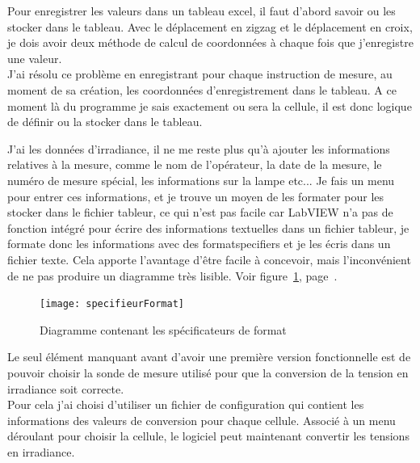 \documentclass[12pt]{article}
\begin{document}
Pour enregistrer les valeurs dans un tableau excel, il faut d'abord savoir ou les stocker dans le tableau.
Avec le déplacement en zigzag et le déplacement en croix, je dois avoir deux méthode de calcul de coordonnées à chaque fois que j'enregistre une valeur.\\
J'ai résolu ce problème en enregistrant pour chaque instruction de mesure, au moment de sa création, les coordonnées d'enregistrement dans le tableau.
A ce moment là du programme je sais exactement ou sera la cellule, il est donc logique de définir ou la stocker dans le tableau.


J'ai les données d'irradiance, il ne me reste plus qu'à ajouter les informations relatives à la mesure, comme le nom de l'opérateur, la date de la mesure, le numéro de mesure spécial, les informations sur la lampe etc...
Je fais un menu pour entrer ces informations, et je trouve un moyen de les formater pour les stocker dans le fichier tableur, ce qui n'est pas facile car LabVIEW n'a pas de fonction intégré pour écrire des informations textuelles dans un fichier tableur, je formate donc les informations avec des \glspl{formatspecifier} et je les écris dans un fichier texte.
Cela apporte l'avantage d'être facile à concevoir, mais l'inconvénient de ne pas produire un diagramme très lisible.
Voir figure~\ref{fig:specifieurFormat}, page~\pageref{fig:specifieurFormat}.

\begin{figure}[H]
	\centering
	\texttt{[image: specifieurFormat]}
	\caption{Diagramme contenant les spécificateurs de format}
	\label{fig:specifieurFormat}
\end{figure}

Le seul élément manquant avant d'avoir une première version fonctionnelle est de pouvoir choisir la sonde de mesure utilisé pour que la conversion de la tension en irradiance soit correcte.\\
Pour cela j'ai choisi d'utiliser un fichier de configuration qui contient les informations des valeurs de conversion pour chaque cellule. Associé à un menu déroulant pour choisir la cellule, le logiciel peut maintenant convertir les tensions en irradiance.
\end{document}
